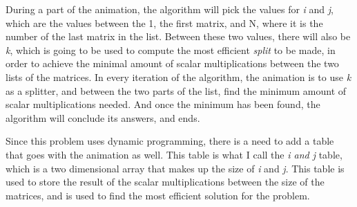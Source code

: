 During a part of the animation, the algorithm will pick the values for \textit{i} and \textit{j}, which are the values between the 1, the first matrix, and N, where it is the number of the last matrix in the list. Between these two values, there will also be \textit{k}, which is going to be used to compute the most efficient \textit{split} to be made, in order to achieve the minimal amount of scalar multiplications between the two lists of the matrices. In every iteration of the algorithm, the animation is to use \textit{k} as a splitter, and between the two parts of the list, find the minimum amount of scalar multiplications needed. And once the minimum has been found, the algorithm will conclude its answers, and ends.

Since this problem uses dynamic programming, there is a need to add a table that goes with the animation as well. This table is what I call the \textit{i and j} table, which is a two dimensional array that makes up the size of \textit{i} and \textit{j}. This table is used to store the result of the scalar multiplications between the size of the matrices, and is used to find the most efficient solution for the problem. 

